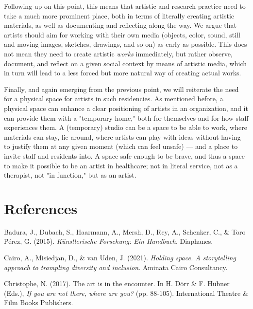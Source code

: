\documentclass[authordate, empirical]{jote-new-article}
\begin{document}
	Following up on this point, this means that artistic and research practice need to take a much more prominent place, both in terms of literally creating artistic materials, as well as documenting and reflecting along the way. We argue that artists should aim for working with their own media (objects, color, sound, still and moving images, sketches, drawings, and so on) as early as possible. This does not mean they need to create artistic \emph{works} immediately, but rather observe, document, and reflect on a given social context by means of artistic media, which in turn will lead to a less forced but more natural way of creating actual works.







	Finally, and again emerging from the previous point, we will reiterate the need for a physical space for artists in such residencies. As mentioned before, a physical space can enhance a clear positioning of artists in an organization, and it can provide them with a "temporary home," both for themselves and for how staff experiences them. A (temporary) studio can be a space to be able to work, where materials can stay, lie around, where artists can play with ideas without having to justify them at any given moment (which can feel unsafe) — and a place to invite staff and residents into. A space safe enough to be brave, and thus a space to make it possible to be an artist in healthcare; not in literal service, not as a therapist, not "in function," but as an artist.



	\section{References}



	Badura, J., Dubach, S., Haarmann, A., Mersh, D., Rey, A., Schenker, C., \& Toro Pérez, G. (2015). \emph{Künstlerische Forschung: Ein Handbuch}. Diaphanes.







	Cairo, A., Misiedjan, D., \& van Uden, J. (2021). \emph{Holding space. A storytelling approach to trampling diversity and inclusion}. Aminata Cairo Consultancy.







	Christophe, N. (2017). The art is in the encounter. In H. Dörr \& F. Hübner (Eds.), \emph{If you are not there, where are you?} (pp. 88-105). International Theatre \& Film Books Publishers.
\end{document}
